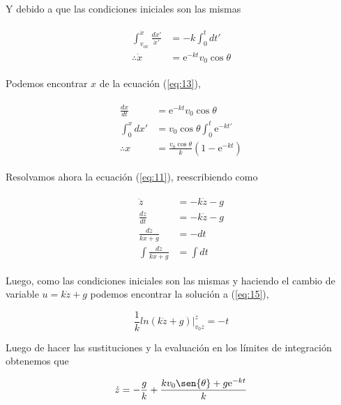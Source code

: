 \documentclass[a4paper,10pt]{article}
\numberwithin{equation}{section}
\newcommand{\euler}{\mathrm{e}}
\begin{document}
Y debido a que las condiciones iniciales son las mismas

\begin{align}
  \begin{split}
  \int_{v_{ox}}^{\dot{x}} \frac{d \dot{x}'}{\dot{x}'} &= - k \int_0^t dt' \\
  \therefore \dot{x} &= \euler^{-kt} v_0 \cos{\theta}
  \end{split}
  \label{eq:13}
 \end{align}

Podemos encontrar $x$ de la ecuación (\ref{eq:13}),

\begin{align}
  \begin{split}
  \frac{dx}{dt} &= \euler^{-kt} v_0 \cos{\theta} \\
  \int_0^x dx' &= v_0 \cos{\theta} \int_0^t \euler^{-kt'} \\
  \therefore x &= \frac{v_0\cos{\theta}}{k}(1 - \euler^{-kt}) 
  \end{split}
  \label{eq:14}
 \end{align}

Resolvamos ahora la ecuación (\ref{eq:11}), reescribiendo como

\begin{align}
\begin{split}
 \ddot{z} &= - k \dot{z} - g \\
 \frac{d \dot{z}}{dt} &= - k \dot{z} -g \\
 \frac{d \dot{z}}{k\dot{x} +g} &= - dt \\
 \int \frac{d \dot{z}}{k\dot{x} +g} &= \int dt
 \end{split}
 \label{eq:15}
\end{align}

Luego, como las condiciones iniciales son las mismas y haciendo el
cambio de variable $u=k\dot{z}+g$ podemos encontrar la solución a 
(\ref{eq:15}),

\begin{equation}
 \frac{1}{k} ln (k\dot{z}+g)|_{v_0z}^{\dot{z}} = -t
\end{equation}

Luego de hacer las sustituciones y la evaluación en los límites de integración
obtenemos que

\begin{equation}
 \dot{z} = - \frac{g}{k} + \frac{k v_0 \sen{\theta}+g\euler^{-kt}}{k}
 \label{eq:16}
\end{equation}
\end{document}
